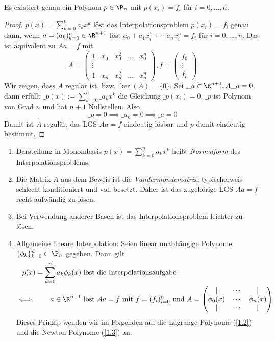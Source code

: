 \documentclass[11pt]{scrbook}
\begin{document}
\begin{st}
	\label{1.1}
	Es existiert genau ein Polynom $p\in \P_n$ mit $p(x_i)=f_i$ für $i=0,\dotsc,n$.
	\begin{proof}
		$p(x) = \sum_{k=0}^n a_k x^k$ löst das Interpolationsproblem $p(x_i)=f_i$ genau dann, wenn $a=(a_k)_{k=0}^n \in \R^{n+1}$ löst $a_0 +a_1x_i^1 + \dotsb a_nx_i^n = f_i$ für $i=0,\dotsc,n$.
		Das ist äquivalent zu $Aa=f$ mit
		\[
		A= \begin{pmatrix} 1 & x_0 & x_0^2 & \hdots & x_0^n \\
		\vdots  \\
		1 & x_n & x_n^2 & \hdots & x_n^n\end{pmatrix}, f= \begin{pmatrix}f_0 \\ \vdots \\ f_n\end{pmatrix}
		\]
		Wir zeigen, dass $A$ regulär ist, bzw. $\ker(A) = \{0\}$.
		Sei $\_a \in \R^{n+1}, A\_a=0$, dann erfüllt
		$\_p(x) := \sum_{k=0}^n\_a_k x^k$ die Gleichung $\_p(x_i)=0$.
		$\_p$ ist Polynom von Grad $n$ und hat $n+1$ Nullstellen. 
		Also 
		\[
			\_p=0 \implies \_a_k=0 \implies \_a=0
		\]
		Damit ist $A$ regulär, das LGS $Aa=f$ eindeutig lösbar und $p$ damit eindeutig bestimmt.
	\end{proof}
	\begin{note}
		\begin{enumerate}
			\item 
				Darstellung in Monombasis $p(x)= \sum_{k=0}^n a_kx^k$ heißt \emph{Normalform} des Interpolationsproblems.
			\item
				Die Matrix $A$ aus dem Beweis ist die \emph{Vandermondematrix}, typischerweis schlecht konditioniert und voll besetzt.
				Daher ist das zugehörige LGS $Aa=f$ recht aufwändig zu lösen.
			\item
				Bei Verwendung anderer Basen ist das Interpolationsproblem leichter zu lösen.
			\item
				Allgemeine lineare Interpolation:
				Seien linear unabhängige Polynome $\{\phi_k\}_{k=0}^n \subset \P_n$ gegeben.
				Dann gilt
				\begin{align*}
					p(x) = \sum_{k=0}^n a_k \phi_k(x) &\text{ löst die Interpolationsaufgabe}\\
					\iff \qquad a\in \R^{n+1} &\text{ löst } Aa=f \text{ mit } f=(f_i)_{i=0}^n \text{ und } A= \begin{pmatrix}\mid & \cdots & \mid \\
						\phi_0(x) & \cdots & \phi_n(x)\\
						\mid & \cdots & \mid
					\end{pmatrix}
				\end{align*}
				Dieses Prinzip wenden wir im Folgenden auf die Lagrange-Polynome (\ref{1.2}) und die Newton-Polynome (\ref{1.3}) an.
		\end{enumerate}
		
	\end{note}
\end{st}
\end{document}
